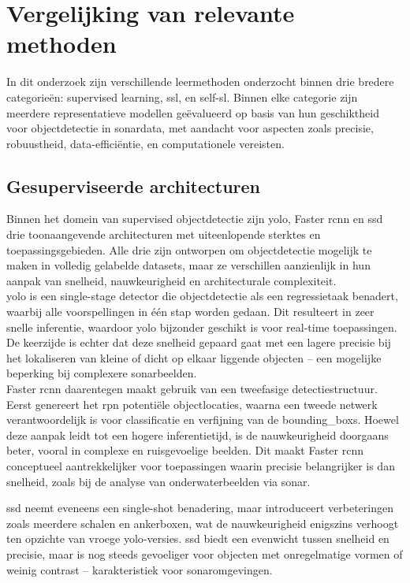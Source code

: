 \section{Vergelijking van relevante methoden}

In dit onderzoek zijn verschillende leermethoden onderzocht binnen drie bredere categorieën: supervised learning, \gls{ssl}, en \gls{self-sl}. Binnen elke categorie zijn meerdere representatieve modellen geëvalueerd op basis van hun geschiktheid voor objectdetectie in sonardata, met aandacht voor aspecten zoals precisie, robuustheid, data-efficiëntie, en computationele vereisten. 

\subsection{Gesuperviseerde architecturen}

Binnen het domein van supervised objectdetectie zijn \gls{yolo}, Faster \gls{rcnn} en \gls{ssd} drie toonaangevende architecturen met uiteenlopende sterktes en toepassingsgebieden. Alle drie zijn ontworpen om objectdetectie mogelijk te maken in volledig gelabelde datasets, maar ze verschillen aanzienlijk in hun aanpak van snelheid, nauwkeurigheid en architecturale complexiteit. \\

\gls{yolo} is een single-stage detector die objectdetectie als een regressietaak benadert, waarbij alle voorspellingen in één stap worden gedaan. Dit resulteert in zeer snelle inferentie, waardoor \gls{yolo} bijzonder geschikt is voor real-time toepassingen. De keerzijde is echter dat deze snelheid gepaard gaat met een lagere precisie bij het lokaliseren van kleine of dicht op elkaar liggende objecten -- een mogelijke beperking bij complexere sonarbeelden. \\

Faster \gls{rcnn} daarentegen maakt gebruik van een tweefasige detectiestructuur. Eerst genereert het \gls{rpn} potentiële objectlocaties, waarna een tweede netwerk verantwoordelijk is voor classificatie en verfijning van de \glspl{bounding_box}. Hoewel deze aanpak leidt tot een hogere inferentietijd, is de nauwkeurigheid doorgaans beter, vooral in complexe en ruisgevoelige beelden. Dit maakt Faster \gls{rcnn} conceptueel aantrekkelijker voor toepassingen waarin precisie belangrijker is dan snelheid, zoals bij de analyse van onderwaterbeelden via sonar.

\gls{ssd} neemt eveneens een single-shot benadering, maar introduceert verbeteringen zoals meerdere schalen en ankerboxen, wat de nauwkeurigheid enigszins verhoogt ten opzichte van vroege \gls{yolo}-versies. \gls{ssd} biedt een evenwicht tussen snelheid en precisie, maar is nog steeds gevoeliger voor objecten met onregelmatige vormen of weinig contrast -- karakteristiek voor sonaromgevingen.

